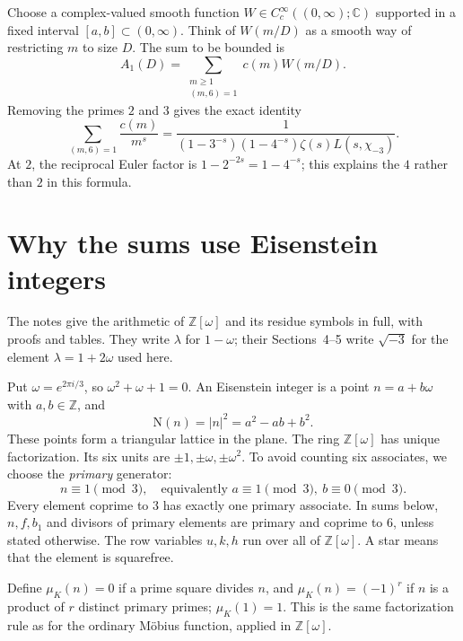 \documentclass[11pt]{article}
\newcommand{\OO}{\mathbb Z[\omega]}
\newcommand{\N}{\mathrm N}
\newcommand{\muk}{\mu_K}
\newcommand{\ch}{\chi_{-3}}
\numberwithin{equation}{section}
\begin{document}
Choose a complex-valued smooth function
$W\in C_c^\infty((0,\infty);\mathbb C)$ supported in a fixed interval
$[a,b]\subset(0,\infty)$. Think of $W(m/D)$ as a smooth way of restricting
$m$ to size $D$. The sum to be bounded is
\begin{equation}\label{eq:A1integer}
 A_1(D)=\sum_{\substack{m\ge1\\(m,6)=1}}c(m)W(m/D).
\end{equation}
Removing the primes $2$ and $3$ gives the exact identity
\begin{equation}\label{eq:reciprocal}
 \sum_{(m,6)=1}\frac{c(m)}{m^s}
 =\frac1{(1-3^{-s})(1-4^{-s})\zeta(s)L(s,\ch)}.
\end{equation}
At $2$, the reciprocal Euler factor is $1-2^{-2s}=1-4^{-s}$;
this explains the $4$ rather than $2$ in this formula.

\section{Why the sums use Eisenstein integers}\label{sec:eisenstein}

The notes \cite[Sections~2--3]{QF} give the arithmetic of $\OO$ and its residue symbols in
full, with proofs and tables. They write $\lambda$ for $1-\omega$; their Sections~4--5
write $\sqrt{-3}$ for the element $\lambda=1+2\omega$ used here.

Put $\omega=e^{2\pi i/3}$, so $\omega^2+\omega+1=0$. An Eisenstein integer
is a point $n=a+b\omega$ with $a,b\in\mathbb Z$, and
\begin{equation}\label{eq:normdef}
 \N(n)=|n|^2=a^2-ab+b^2.
\end{equation}
These points form a triangular lattice in the plane. The ring $\OO$ has
unique factorization. Its six units are $\pm1,\pm\omega,\pm\omega^2$.
To avoid counting six associates, we choose the \emph{primary} generator:
\begin{equation}\label{eq:primarydef}
 n\equiv1\pmod3,\quad\text{equivalently }a\equiv1\pmod3,\ b\equiv0\pmod3.
\end{equation}
Every element coprime to $3$ has exactly one primary associate. In sums
below, $n,f,b_1$ and divisors of primary elements are primary and coprime
to $6$, unless stated otherwise. The row variables $u,k,h$ run over all
of $\OO$. A star means that the element is squarefree.

Define $\muk(n)=0$ if a prime square divides $n$, and
$\muk(n)=(-1)^r$ if $n$ is a product of $r$ distinct primary primes;
$\muk(1)=1$. This is the same factorization rule as for the ordinary
M\"obius function, applied in $\OO$.
\end{document}
